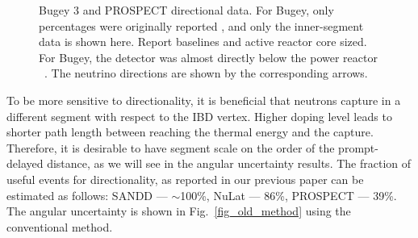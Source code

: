 \documentclass[tightenlines,twocolumn,prl,notitlepage,nofootinbib,preprintnumbers,longbibliography]{revtex4-1}
\begin{document}
\begin{figure}[!h]
\caption{Bugey 3 and PROSPECT directional data. For Bugey, only percentages were originally reported \cite{Cussonneau:1992lua}, and only the inner-segment data is shown here. Report baselines and active reactor core sized. For Bugey, the detector was almost directly below the power reactor ~\cite{PhysRevD.111.032014, Jayakumar:2024job}. The neutrino directions are shown by the corresponding arrows.}
\label{fig:Bugey_Prospect_data}
\end{figure}


To be more sensitive to directionality, it is beneficial that neutrons capture in a different segment with respect to the IBD vertex. 
Higher doping level leads to shorter path length between reaching the thermal energy and the capture.
Therefore, it is desirable to have segment scale on the order of the prompt-delayed distance, as we will see in the angular uncertainty results. The fraction of useful events for directionality, as reported in our previous paper can be estimated as follows:
SANDD --- $\sim$100\%, NuLat --- 86\%, PROSPECT --- 39\%.
The angular uncertainty is shown in Fig.~\ref{fig_old_method} using the conventional method.
\end{document}
